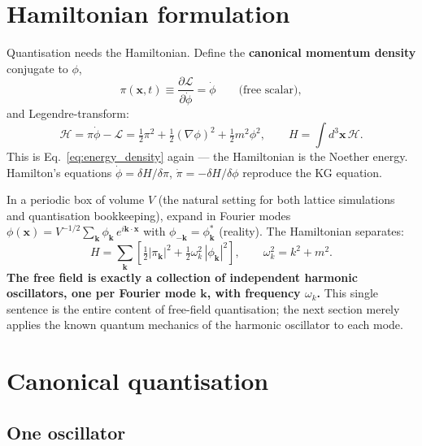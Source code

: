 \documentclass[12pt]{article}
\newcommand{\bk}{\mathbf{k}}
\newcommand{\bx}{\mathbf{x}}
\newcommand{\Lag}{\mathcal{L}}
\newcommand{\Ham}{\mathcal{H}}
\begin{document}
\section{Hamiltonian formulation}
\label{sec:hamiltonian}

Quantisation needs the Hamiltonian.  Define the \textbf{canonical
momentum density} conjugate to $\phi$,
%
\begin{equation}
  \pi(\bx,t) \equiv \frac{\partial\Lag}{\partial\dot\phi} = \dot\phi
  \qquad\text{(free scalar)},
\end{equation}
%
and Legendre-transform:
%
\begin{equation}
  \Ham = \pi\dot\phi - \Lag
       = \tfrac{1}{2}\pi^2 + \tfrac{1}{2}(\nabla\phi)^2
         + \tfrac{1}{2}m^2\phi^2,
  \qquad
  H = \int d^3\bx\,\Ham.
  \label{eq:hamiltonian}
\end{equation}
%
This is Eq.~\eqref{eq:energy_density} again --- the Hamiltonian is
the Noether energy.  Hamilton's equations
$\dot\phi = \delta H/\delta\pi$, $\dot\pi = -\delta H/\delta\phi$
reproduce the KG equation.

In a periodic box of volume $V$ (the natural setting for both lattice
simulations and quantisation bookkeeping), expand in Fourier modes
$\phi(\bx) = V^{-1/2}\sum_\bk \phi_\bk\, e^{i\bk\cdot\bx}$ with
$\phi_{-\bk} = \phi_\bk^*$ (reality).  The Hamiltonian separates:
%
\begin{equation}
  H = \sum_{\bk} \left[
        \tfrac{1}{2}|\pi_\bk|^2
        + \tfrac{1}{2}\omega_k^2\,|\phi_\bk|^2
      \right],
  \qquad
  \omega_k^2 = k^2 + m^2.
  \label{eq:H_modes}
\end{equation}
%
\textbf{The free field is exactly a collection of independent harmonic
oscillators, one per Fourier mode $\bk$, with frequency $\omega_k$.}
This single sentence is the entire content of free-field quantisation;
the next section merely applies the known quantum mechanics of the
harmonic oscillator to each mode.

\section{Canonical quantisation}
\label{sec:quantization}

\subsection{One oscillator}
\label{sec:oscillator}
\end{document}
